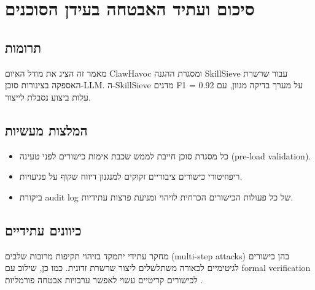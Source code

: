 
\chapter{סיכום ועתיד האבטחה בעידן הסוכנים}

\section{תרומות}

מאמר זה הציג את מודל האיום \textenglish{ClawHavoc} ומסגרת ההגנה \textenglish{SkillSieve} עבור שרשרת האספקה בצינורות סוכן-\textenglish{LLM}. ה-\textenglish{SkillSieve} מדגים \textenglish{F1 = 0.92} על מערך בדיקה מגוון, עם עלות ביצוע נסבלת לייצור.

\section{המלצות מעשיות}

\begin{itemize}
\item כל מסגרת סוכן חייבת לממש שכבת אימות כישורים לפני טעינה (\textenglish{pre-load validation}).
\item ריפוזיטורי כישורים ציבוריים זקוקים למנגנון דיווח שקוף על פגיעויות.
\item ביקורת \textenglish{audit log} של כל פעולות הכישורים הכרחית לזיהוי ומניעת פרצות עתידיות.
\end{itemize}

\section{כיוונים עתידיים}

מחקר עתידי יתמקד בזיהוי תקיפות מרובות שלבים (\textenglish{multi-step attacks}) בהן כישורים לגיטימיים לכאורה משתלשלים ליצור שרשרת זדונית. כמו כן, שילוב עם \textenglish{formal verification} לכישורים קריטיים עשוי לאפשר ערבויות אבטחה פורמליות \cite{weidinger2021ethical}.
